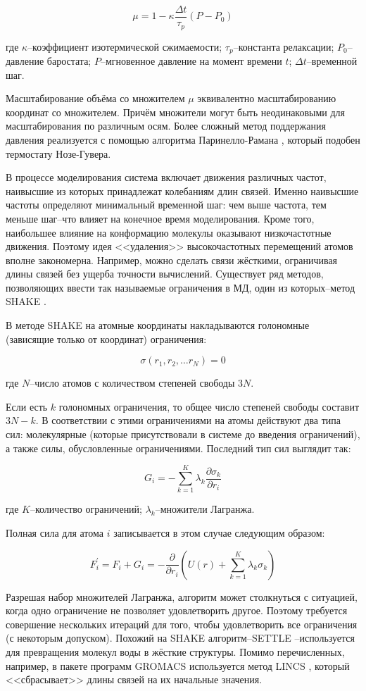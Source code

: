 \[
\mu = 1 - \kappa {\frac{\Delta t}{\tau_p}} (P - P_0)
\]

где $\kappa$--коэффициент изотермической сжимаемости; $\tau_p$--константа релаксации; $P_0$--давление баростата; $P$--мгновенное давление на момент времени $t$; $\Delta t$--временной шаг.

Масштабирование объёма со множителем $\mu$ эквивалентно масштабированию координат со множителем. Причём множители могут быть неодинаковыми для масштабирования по различным осям. Более сложный метод поддержания давления реализуется с помощью алгоритма Паринелло-Рамана \cite{Parrinello1981}, который подобен термостату Нозе-Гувера.

В процессе моделирования система включает движения различных частот, наивысшие из которых принадлежат колебаниям длин связей. Именно наивысшие частоты определяют минимальный временной шаг: чем выше частота, тем меньше шаг--что влияет на конечное время моделирования. Кроме того, наибольшее влияние на конформацию молекулы оказывают низкочастотные движения. Поэтому идея <<удаления>> высокочастотных перемещений атомов вполне закономерна. Например, можно сделать связи жёсткими, ограничивая длины связей без ущерба точности вычислений. Существует ряд методов, позволяющих ввести так называемые ограничения в МД, один из которых--метод SHAKE \cite{Ryckaert1977}.

В методе SHAKE на атомные координаты накладываются голономные (зависящие только от координат) ограничения:

\[
\sigma(r_1, r_2, \ldots r_N) = 0
\]

где $N$--число атомов с количеством степеней свободы $3N$.

Если есть $k$ голономных ограничения, то общее число степеней свободы составит $3N-k$. В соответствии с этими ограничениями на атомы действуют два типа сил: молекулярные (которые присутствовали в системе до введения ограничений), а также силы, обусловленные ограничениями. Последний тип сил выглядит так:

\[
G_i = - \sum_{k=1}^K {\lambda_k \frac{\partial \sigma_k}{\partial r_i}}
\]

где $K$--количество ограничений; $\lambda_k$--множители Лагранжа.

Полная сила для атома $i$ записывается в этом случае следующим образом:

\[
F_i^{'} = F_i + G_i = - {\frac{\partial}{\partial r_i}} \left ( U(r) + \sum_{k=1}^K {\lambda_k \sigma_k} \right )
\]

Разрешая набор множителей Лагранжа, алгоритм может столкнуться с ситуацией, когда одно ограничение не позволяет удовлетворить другое. Поэтому требуется совершение нескольких итераций для того, чтобы удовлетворить все ограничения (с некоторым допуском). Похожий на SHAKE алгоритм--SETTLE \cite{Miyamoto1992}--используется для превращения молекул воды в жёсткие структуры. Помимо перечисленных, например, в пакете программ GROMACS используется метод LINCS \cite{Hess1997}, который <<сбрасывает>> длины связей на их начальные значения.

